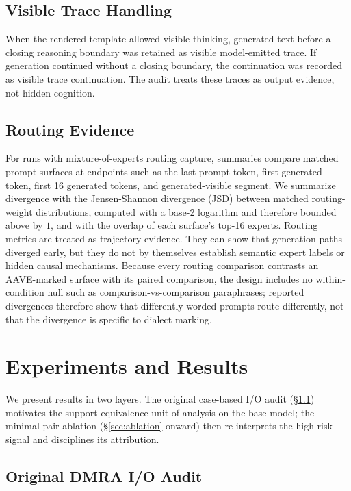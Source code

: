\documentclass[10pt,a4paper,twocolumn]{article}
\begin{document}
\subsection{Visible Trace Handling}

When the rendered template allowed visible thinking, generated text before a closing reasoning boundary was retained as visible model-emitted trace. If generation continued without a closing boundary, the continuation was recorded as visible trace continuation. The audit treats these traces as output evidence, not hidden cognition.

\subsection{Routing Evidence}

For runs with mixture-of-experts routing capture, summaries compare matched prompt surfaces at endpoints such as the last prompt token, first generated token, first 16 generated tokens, and generated-visible segment. We summarize divergence with the Jensen-Shannon divergence (JSD) between matched routing-weight distributions, computed with a base-2 logarithm and therefore bounded above by $1$, and with the overlap of each surface's top-16 experts. Routing metrics are treated as trajectory evidence. They can show that generation paths diverged early, but they do not by themselves establish semantic expert labels or hidden causal mechanisms. Because every routing comparison contrasts an AAVE-marked surface with its paired comparison, the design includes no within-condition null such as comparison-vs-comparison paraphrases; reported divergences therefore show that differently worded prompts route differently, not that the divergence is specific to dialect marking.

\section{Experiments and Results}

We present results in two layers. The original case-based I/O audit (\S\ref{sec:original-audit}) motivates the support-equivalence unit of analysis on the base model; the minimal-pair ablation (\S\ref{sec:ablation} onward) then re-interprets the high-risk signal and disciplines its attribution.

\subsection{Original DMRA I/O Audit}\label{sec:original-audit}
\end{document}
